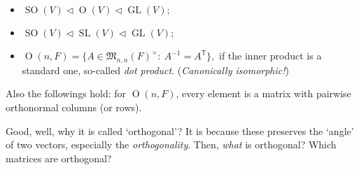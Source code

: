 \begin{prop}
\hfill
\begin{itemize}
    \item $\operatorname{SO}(V) \triangleleft\operatorname{O}(V) \triangleleft \operatorname{GL}(V);$
    \item $\operatorname{SO}(V) \triangleleft\operatorname{SL}(V) \triangleleft \operatorname{GL}(V);$
    \item $\operatorname{O}(n, F) = \{ A\in \mathfrak M_{n,n}(F)^\times:~ A^{-1}=A^\mathsf T\},$ if the inner product is a standard one, so-called \textit{dot product}. (\textit{Canonically isomorphic!})
\end{itemize}
Also the followings hold: for $\operatorname{O}(n, F)$,  every element is a matrix with pairwise orthonormal columns (or rows).
\end{prop}
Good, well, why it is called `orthogonal'? It is because these preserves the `angle' of two vectors, especially the \textit{orthogonality}. Then, \textit{what} is orthogonal? Which matrices are orthogonal?
